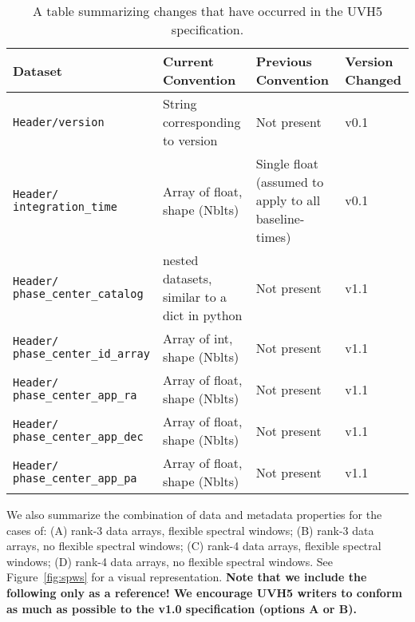 \documentclass[11pt, oneside]{article}
\begin{document}
\begin{table}[t]
\begin{center}
  \begin{tabular}{ m{10em} | m{10em} | m{10em} | m{4em} }
    \textbf{Dataset} & \makecell[cl]{\textbf{Current}\\\textbf{Convention}} & \makecell[cl]{\textbf{Previous}\\\textbf{Convention}} & \textbf{Version Changed} \\\hline\hline
    \texttt{Header/version} & String corresponding to version & Not present & v0.1 \\[1em] \hline
    \makecell[tl]{\texttt{Header/}\\\texttt{integration\_time}} & Array of float, shape (Nblts) & Single float (assumed to apply to all baseline-times) & v0.1 \\[1.75em] \hline
    \makecell[tl]{\texttt{Header/}\\\texttt{phase\_center\_catalog}} & nested datasets, similar to a dict in python & Not present & v1.1 \\[1.75em] \hline
    \makecell[tl]{\texttt{Header/}\\\texttt{phase\_center\_id\_array}} & Array of int, shape (Nblts) & Not present & v1.1 \\[1.75em] \hline
    \makecell[tl]{\texttt{Header/}\\\texttt{phase\_center\_app\_ra}} & Array of float, shape (Nblts) & Not present & v1.1 \\[1.75em] \hline
    \makecell[tl]{\texttt{Header/}\\\texttt{phase\_center\_app\_dec}} & Array of float, shape (Nblts) & Not present & v1.1 \\[1.75em] \hline
    \makecell[tl]{\texttt{Header/}\\\texttt{phase\_center\_app\_pa}} & Array of float, shape (Nblts) & Not present & v1.1 \\[1.75em]
  \end{tabular}
\end{center}
  \caption{A table summarizing changes that have occurred in the UVH5 specification.}
  \label{table:history}
\end{table}

We also summarize the combination of data and metadata properties for the cases
of: (A) rank-3 data arrays, flexible spectral windows; (B) rank-3 data arrays,
no flexible spectral windows; (C) rank-4 data arrays, flexible spectral windows;
(D) rank-4 data arrays, no flexible spectral windows. See Figure~\ref{fig:spws}
for a visual representation. \textbf{Note that we include the following only as
  a reference! We encourage UVH5 writers to conform as much as possible to the
  v1.0 specification (options A or B).}
\end{document}
